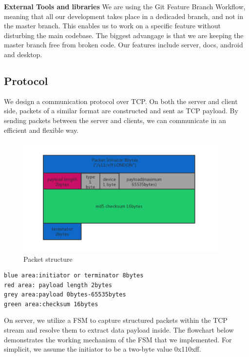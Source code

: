 \documentclass{article}
\begin{document}
\textbf{External Tools and libraries}
We are using the Git Feature Branch Workflow, meaning that all our development takes place in a dedicaded branch, and not in the master branch. This enables us to work on a specific feature without disturbing the main codebase. The biggest advangage is that we are keeping the master branch free from broken code. Our features include server, docs, android and desktop.

\subsection{Protocol}

We design a communication protocol over TCP. On both the server and client side, packets of a similar format are constructed and sent as TCP payload. By sending packets between the server and clients, we can communicate in an efficient and flexible way.

\begin{figure}[H]
    \centering
    \includegraphics[width=0.95\textwidth]{packet}
    \caption{Packet structure}
    \label{fig:packet1}
\end{figure}

\begin{lstlisting}
blue area:initiator or terminator 8bytes
red area: payload length 2bytes
grey area:payload 0bytes-65535bytes
green area:checksum 16bytes
\end{lstlisting}

On server, we utilize a FSM to capture structured packets within the TCP stream and resolve them to extract data payload inside. The flowchart below demonstrates the working mechanism of the FSM that we implemented.
\newline
\hfill \break
For simplicit, we assume the initiator to be a two-byte value 0x110xff.
\end{document}
